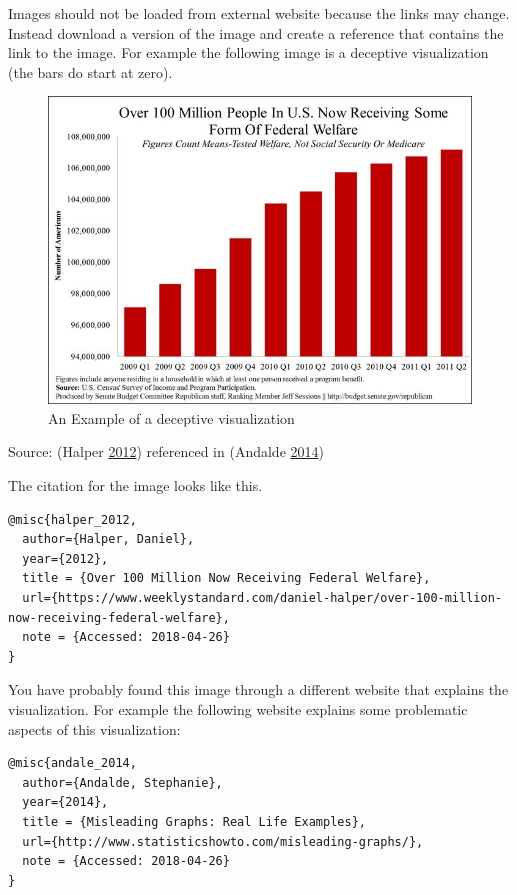 \documentclass[]{book}
\theoremstyle{definition}
\theoremstyle{definition}
\theoremstyle{definition}
\theoremstyle{remark}
\begin{document}
Images should not be loaded from external website because the links may
change. Instead download a version of the image and create a reference
that contains the link to the image. For example the following image is
a deceptive visualization (the bars do start at zero).

\begin{figure}
\centering
\includegraphics{images/halper_welfare.jpg}
\caption{An Example of a deceptive visualization}
\end{figure}

Source: (Halper \protect\hyperlink{ref-halper_2012}{2012}) referenced in
(Andalde \protect\hyperlink{ref-andale_2014}{2014})

The citation for the image looks like this.

\begin{verbatim}
@misc{halper_2012,
  author={Halper, Daniel},
  year={2012},
  title = {Over 100 Million Now Receiving Federal Welfare},
  url={https://www.weeklystandard.com/daniel-halper/over-100-million-now-receiving-federal-welfare},
  note = {Accessed: 2018-04-26}
}
\end{verbatim}

You have probably found this image through a different website that
explains the visualization. For example the following website explains
some problematic aspects of this visualization:

\begin{verbatim}
@misc{andale_2014,
  author={Andalde, Stephanie},
  year={2014},
  title = {Misleading Graphs: Real Life Examples},
  url={http://www.statisticshowto.com/misleading-graphs/},
  note = {Accessed: 2018-04-26}
}
\end{verbatim}
\end{document}
